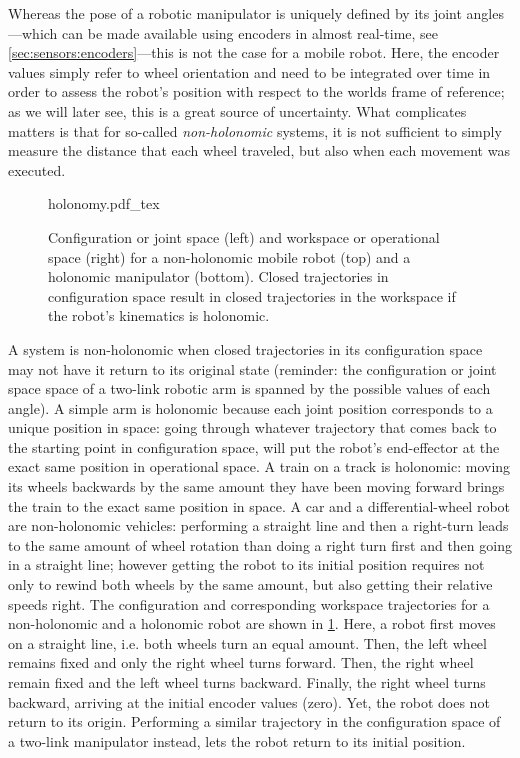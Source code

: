 Whereas the pose of a robotic manipulator is uniquely defined by its joint angles---which can be made available using encoders in almost real-time, see \cref{sec:sensors:encoders}---this is not the case for a mobile robot.
Here, the encoder values simply refer to wheel orientation and need to be integrated over time in order to assess the robot's position with respect to the worlds frame of reference; as we will later see, this is a great source of uncertainty.
What complicates matters is that for so-called \emph{non-holonomic} systems, it is not sufficient to simply measure the distance that each wheel traveled, but also when each movement was executed.

\begin{figure}[!t]
    \small
    \centering
    \def\svgwidth{\textwidth}
    {holonomy.pdf_tex}
    \caption{Configuration or joint space (left) and workspace or operational space (right) for a non-holonomic mobile robot (top) and a holonomic manipulator (bottom). Closed trajectories in configuration space result in closed trajectories in the workspace if the robot's kinematics is holonomic.}
    \label{fig:holonomy}
\end{figure}

A system is non-holonomic when closed trajectories in its configuration space may not have it return to its original state (reminder: the configuration or joint space space of a two-link robotic arm is spanned by the possible values of each angle).
A simple arm is holonomic because each joint position corresponds to a unique position in space:
going through whatever trajectory that comes back to the starting point in configuration space, will put the robot's end-effector at the exact same position in operational space.
A train on a track is holonomic: moving its wheels backwards by the same amount they have been moving forward brings the train to the exact same position in space.
A car and a differential-wheel robot are non-holonomic vehicles: performing a straight line and then a right-turn leads to the same amount of wheel rotation than doing a right turn first and then going in a straight line; however getting the robot to its initial position requires not only to rewind both wheels by the same amount, but also getting their relative speeds right.
The configuration and corresponding workspace trajectories for a non-holonomic and a holonomic robot are shown in \cref{fig:holonomy}.
Here, a robot first moves on a straight line, i.e. both wheels turn an equal amount.
Then, the left wheel remains fixed and only the right wheel turns forward.
Then, the right wheel remain fixed and the left wheel turns backward.
Finally, the right wheel turns backward, arriving at the initial encoder values (zero).
Yet, the robot does not return to its origin. Performing a similar trajectory in the configuration space of a two-link manipulator instead, lets the robot return to its initial position.

